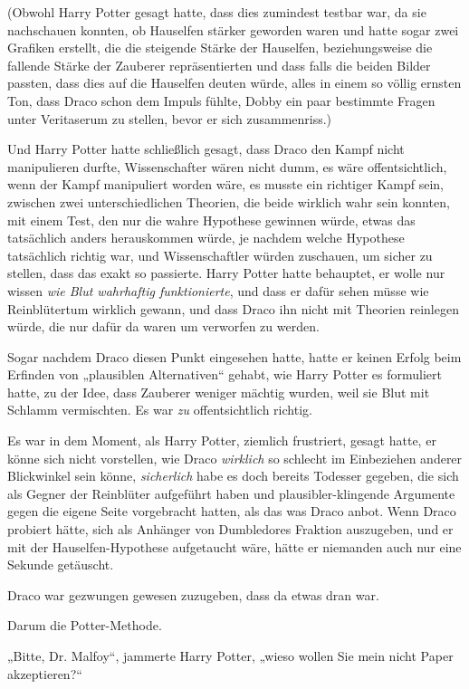 {(Obwohl Harry Potter gesagt hatte, dass dies zumindest testbar war, da sie nachschauen konnten, ob Hauselfen stärker geworden waren und hatte sogar zwei Grafiken erstellt, die die steigende Stärke der Hauselfen, beziehungsweise die fallende Stärke der Zauberer repräsentierten und dass falls die beiden Bilder passten, dass dies auf die Hauselfen deuten würde, alles in einem so völlig ernsten Ton, dass Draco schon dem Impuls fühlte, Dobby ein paar bestimmte Fragen unter Veritaserum zu stellen, bevor er sich zusammenriss.)

Und Harry Potter hatte schließlich gesagt, dass Draco den Kampf nicht manipulieren durfte, Wissenschafter wären nicht dumm, es wäre offentsichtlich, wenn der Kampf manipuliert worden wäre, es musste ein richtiger Kampf sein, zwischen zwei unterschiedlichen Theorien, die beide wirklich wahr sein konnten, mit einem Test, den nur die wahre Hypothese gewinnen würde, etwas das tatsächlich anders herauskommen würde, je nachdem welche Hypothese tatsächlich richtig war, und Wissenschaftler würden zuschauen, um sicher zu stellen, dass das exakt so passierte. Harry Potter hatte behauptet, er wolle nur wissen \emph{wie Blut wahrhaftig funktionierte}, und dass er dafür sehen müsse wie Reinblütertum wirklich gewann, und dass Draco ihn nicht mit Theorien reinlegen würde, die nur dafür da waren um verworfen zu werden.

Sogar nachdem Draco diesen Punkt eingesehen hatte, hatte er keinen Erfolg beim Erfinden von „plausiblen Alternativen“ gehabt, wie Harry Potter es formuliert hatte, zu der Idee, dass Zauberer weniger mächtig wurden, weil sie Blut mit Schlamm vermischten. Es war \emph{zu} offentsichtlich richtig.

Es war in dem Moment, als Harry Potter, ziemlich frustriert, gesagt hatte, er könne sich nicht vorstellen, wie Draco \emph{wirklich} so schlecht im Einbeziehen anderer Blickwinkel sein könne, \emph{sicherlich} habe es doch bereits Todesser gegeben, die sich als Gegner der Reinblüter aufgeführt haben und plausibler-klingende Argumente gegen die eigene Seite vorgebracht hatten, als das was Draco anbot. Wenn Draco probiert hätte, sich als Anhänger von Dumbledores Fraktion auszugeben, und er mit der Hauselfen-Hypothese aufgetaucht wäre, hätte er niemanden auch nur eine Sekunde getäuscht.

Draco war gezwungen gewesen zuzugeben, dass da etwas dran war.

Darum die Potter-Methode.

„Bitte, Dr. Malfoy“, jammerte Harry Potter, „wieso wollen Sie mein nicht Paper akzeptieren?“

}
